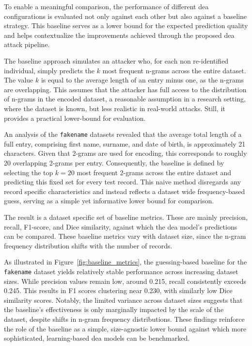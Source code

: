 To enable a meaningful comparison, the performance of different \ac{dea} configurations is evaluated not only against each other but also against a baseline strategy.
This baseline serves as a lower bound for the expected prediction quality and helps contextualize the improvements achieved through the proposed \ac{dea} attack pipeline.

The baseline approach simulates an attacker who, for each non re-identified individual, simply predicts the $k$ most frequent n-grams across the entire dataset.
The value $k$ is equal to the average length of an entry minus one, as the n-grams are overlapping.
This assumes that the attacker has full access to the distribution of n-grams in the encoded dataset, a reasonable assumption in a research setting, where the dataset is known, but less realistic in real-world attacks.
Still, it provides a practical lower-bound for evaluation.

An analysis of the \texttt{fakename} datasets revealed that the average total length of a full entry, comprising first name, surname, and date of birth, is approximately 21 characters.
Given that 2-grams are used for encoding, this corresponds to roughly 20 overlapping 2-grams per entry.
Consequently, the baseline is defined by selecting the top $k=20$ most frequent 2-grams across the entire dataset and predicting this fixed set for every test record.
This naive method disregards any record specific characteristics and instead reflects a dataset wide frequency-based guess, serving as a simple yet informative lower bound for comparison.

The result is a dataset specific set of baseline metrics.
These are mainly precision, recall, F1-score, and Dice similarity, against which the \ac{dea} model's predictions can be compared.
These baseline metrics vary with dataset size, since the n-gram frequency distribution shifts with the number of records.

As illustrated in Figure~\ref{fig:baseline_metrics}, the guessing-based baseline for the \texttt{fakename} dataset yields relatively stable performance across increasing dataset sizes.
While precision values remain low, around 0.215, recall consistently exceeds 0.245.
This results in F1 scores clustering near 0.230, with similarly low Dice similarity scores.
Notably, the limited variance across dataset sizes suggests that the baseline's effectiveness is only marginally impacted by the scale of the dataset, despite shifts in n-gram frequency distributions.
These findings reinforce the role of the baseline as a simple, size-agnostic lower bound against which more sophisticated, learning-based \ac{dea} models can be benchmarked.

